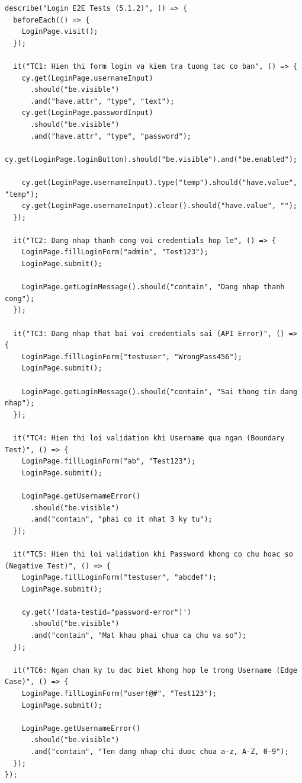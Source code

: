 \documentclass[a4paper,12pt]{article}
\begin{document}
{\begin{tcolorbox}[breakable, colback=green!5,colframe=black!50,title=Automated tests cho toàn bộ login flow]
\begin{lstlisting}
describe("Login E2E Tests (5.1.2)", () => {
  beforeEach(() => {
    LoginPage.visit();
  });

  it("TC1: Hien thi form login va kiem tra tuong tac co ban", () => {
    cy.get(LoginPage.usernameInput)
      .should("be.visible")
      .and("have.attr", "type", "text");
    cy.get(LoginPage.passwordInput)
      .should("be.visible")
      .and("have.attr", "type", "password");
    cy.get(LoginPage.loginButton).should("be.visible").and("be.enabled");

    cy.get(LoginPage.usernameInput).type("temp").should("have.value", "temp");
    cy.get(LoginPage.usernameInput).clear().should("have.value", "");
  });

  it("TC2: Dang nhap thanh cong voi credentials hop le", () => {
    LoginPage.fillLoginForm("admin", "Test123");
    LoginPage.submit();

    LoginPage.getLoginMessage().should("contain", "Dang nhap thanh cong");
  });

  it("TC3: Dang nhap that bai voi credentials sai (API Error)", () => {
    LoginPage.fillLoginForm("testuser", "WrongPass456");
    LoginPage.submit();

    LoginPage.getLoginMessage().should("contain", "Sai thong tin dang nhap");
  });

  it("TC4: Hien thi loi validation khi Username qua ngan (Boundary Test)", () => {
    LoginPage.fillLoginForm("ab", "Test123");
    LoginPage.submit();

    LoginPage.getUsernameError()
      .should("be.visible")
      .and("contain", "phai co it nhat 3 ky tu");
  });

  it("TC5: Hien thi loi validation khi Password khong co chu hoac so (Negative Test)", () => {
    LoginPage.fillLoginForm("testuser", "abcdef");
    LoginPage.submit();

    cy.get('[data-testid="password-error"]')
      .should("be.visible")
      .and("contain", "Mat khau phai chua ca chu va so");
  });

  it("TC6: Ngan chan ky tu dac biet khong hop le trong Username (Edge Case)", () => {
    LoginPage.fillLoginForm("user!@#", "Test123");
    LoginPage.submit();

    LoginPage.getUsernameError()
      .should("be.visible")
      .and("contain", "Ten dang nhap chi duoc chua a-z, A-Z, 0-9");
  });
});
\end{lstlisting}
\end{tcolorbox}


}
\end{document}
